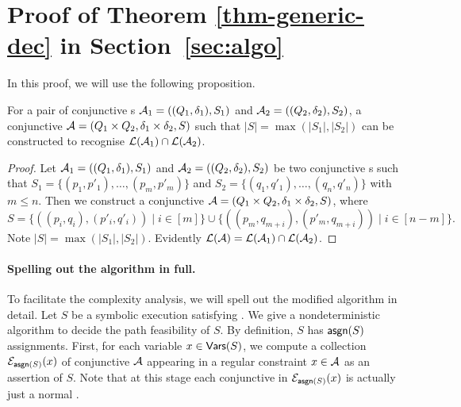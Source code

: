 
\section{Proof of Theorem \ref{thm-generic-dec} in Section~\ref{sec:algo}}\label{app:algo}

In this proof, we will use the following proposition.
\begin{proposition}\label{prop-conj-fa-prod}
For a pair of conjunctive \FA{}s $\mathcal{A}_1 = ((Q_1, \delta_1), S_1)$ and $\mathcal{A}_2 = ((Q_2, \delta_2), S_2)$, a conjunctive \FA{} $\mathcal{A} = (Q_1 \times Q_2, \delta_1 \times \delta_2, S)$ such that $|S| = \max(|S_1|, |S_2|)$ can be constructed to recognise $\mathcal{L}(\mathcal{A}_1) \cap \mathcal{L}(\mathcal{A}_2)$. 
\end{proposition}
\begin{proof}
Let $\mathcal{A}_1 = ((Q_1, \delta_1), S_1)$ and $\mathcal{A}_2 = ((Q_2, \delta_2), S_2)$ be two conjunctive \FA{}s such that $S_1 = \{(p_1, p'_1),\ldots, (p_m, p'_m)\}$ and $S_2 = \{(q_1, q'_1), \ldots, (q_n, q'_n)\}$ with $m \le n$. Then we construct a conjunctive \FA{} $\mathcal{A} = (Q_1 \times Q_2, \delta_1 \times \delta_2, S)$, where 
$$S= \{((p_i, q_i), (p'_i, q'_i)) \mid i \in [m]\} \cup \{((p_m, q_{m+i}), (p'_m, q_{m+i})) \mid i \in [n-m]\}.$$ 
Note $|S|  = \max(|S_1|, |S_2|)$. Evidently $\mathcal{L}(\mathcal{A}) = \mathcal{L}(\mathcal{A}_1) \cap \mathcal{L}(\mathcal{A}_2)$. 
\end{proof}

\paragraph{Spelling out the algorithm in full.}
To facilitate the complexity analysis, we will spell out the modified algorithm 
in detail. Let $S$ be a symbolic execution satisfying \prerec{} . 
We give a nondeterministic algorithm to decide the path feasibility of
$S$. 
By definition, $S$ has $\mathsf{asgn}(S)$ assignments.
First, for each variable $x \in \mathsf{Vars}(S)$,
we compute a collection $\mathcal{E}_{\mathsf{asgn}(S)}(x)$ of conjunctive \FA{}
$\mathcal{A}$ appearing in a regular constraint $x \in \mathcal{A}$ as an assertion of $S$.
Note that at this stage each conjunctive \FA{} in $\mathcal{E}_{\mathsf{asgn}(S)}(x)$ is 
actually just a normal \FA{}. 

